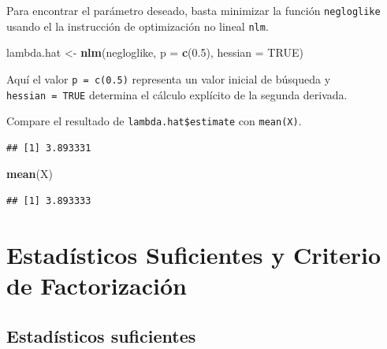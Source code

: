 \documentclass[
  12pt,
]{book}
\newenvironment{Shaded}{\begin{snugshade}}{\end{snugshade}}
\newcommand{\DataTypeTok}[1]{\textcolor[rgb]{0.13,0.29,0.53}{#1}}
\newcommand{\FloatTok}[1]{\textcolor[rgb]{0.00,0.00,0.81}{#1}}
\newcommand{\KeywordTok}[1]{\textcolor[rgb]{0.13,0.29,0.53}{\textbf{#1}}}
\newcommand{\NormalTok}[1]{#1}
\newcommand{\OperatorTok}[1]{\textcolor[rgb]{0.81,0.36,0.00}{\textbf{#1}}}
\newcommand{\OtherTok}[1]{\textcolor[rgb]{0.56,0.35,0.01}{#1}}
\newcommand{\StringTok}[1]{\textcolor[rgb]{0.31,0.60,0.02}{#1}}
\begin{document}
Para encontrar el parámetro deseado, basta minimizar la función \texttt{negloglike} usando el la instrucción de optimización no lineal \texttt{nlm}.

\begin{Shaded}
\begin{Highlighting}[]
\NormalTok{lambda.hat \textless{}{-}}\StringTok{ }\KeywordTok{nlm}\NormalTok{(negloglike, }\DataTypeTok{p =} \KeywordTok{c}\NormalTok{(}\FloatTok{0.5}\NormalTok{), }\DataTypeTok{hessian =} \OtherTok{TRUE}\NormalTok{)}
\end{Highlighting}
\end{Shaded}

Aquí el valor \texttt{p\ =\ c(0.5)} representa un valor inicial de búsqueda y \texttt{hessian\ =\ TRUE} determina el cálculo explícito de la segunda derivada.

Compare el resultado de \texttt{lambda.hat\$estimate} con \texttt{mean(X)}.

\begin{Shaded}
\end{Shaded}

\begin{verbatim}
## [1] 3.893331
\end{verbatim}

\begin{Shaded}
\begin{Highlighting}[]
\KeywordTok{mean}\NormalTok{(X)}
\end{Highlighting}
\end{Shaded}

\begin{verbatim}
## [1] 3.893333
\end{verbatim}

\hypertarget{estaduxedsticos-suficientes-y-criterio-de-factorizaciuxf3n}{%
\chapter{Estadísticos Suficientes y Criterio de Factorización}\label{estaduxedsticos-suficientes-y-criterio-de-factorizaciuxf3n}}

\hypertarget{estaduxedsticos-suficientes}{%
\section{Estadísticos suficientes}\label{estaduxedsticos-suficientes}}
\end{document}
